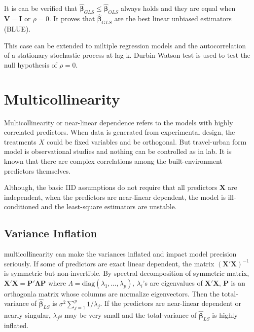 \documentclass[
  11pt,
  openany]{memoir}
\begin{document}
It is can be verified that \(\boldsymbol{\hat\beta}_{GLS}\le\boldsymbol{\hat\beta}_{OLS}\) always holds and they are equal when \(\mathbf{V=I}\) or \(\rho=0\). It proves that \(\boldsymbol{\hat\beta}_{GLS}\) are the best linear unbiased estimators (BLUE).

This case can be extended to miltiple regression models and the autocorrelation of a stationary stochastic process at lag-k.
Durbin-Watson test is used to test the null hypothesis of \(\rho=0\).

\hypertarget{multicollinearity}{%
\section{Multicollinearity}\label{multicollinearity}}

Multicollinearity or near-linear dependence refers to the models with highly correlated predictors. When data is generated from experimental design, the treatments \(X\) could be fixed variables and be orthogonal. But travel-urban form model is observational studies and nothing can be controlled as in lab. It is known that there are complex correlations among the built-environment predictors themselves.

Although, the basic IID assumptions do not require that all predictors \(\mathbf{X}\) are independent, when the predictors are near-linear dependent, the model is ill-conditioned and the least-square estimators are unstable.

\hypertarget{variance-inflation}{%
\subsection{Variance Inflation}\label{variance-inflation}}

multicollinearity can make the variances inflated and impact model precision seriously. If some of predictors are exact linear dependent, the matrix \((\mathbf{X'X})^{-1}\) is symmetric but non-invertible. By spectral decomposition of symmetric matrix, \(\mathbf{X'X}=\mathbf{P'\Lambda P}\) where \(\Lambda=\text{diag}(\lambda_1,...,\lambda_p)\), \(\lambda_i\)'s are eigenvalues of \(\mathbf{X'X}\), \(\mathbf{P}\) is an orthogonla matrix whose columns are normalize eigenvectors. Then the total-variance of \(\boldsymbol{\hat\beta}_{LS}\) is \(\sigma^2\sum_{j=1}^p1/\lambda_j\).
If the predictors are near-linear dependent or nearly singular, \(\lambda_j\)s may be very small and the total-variance of \(\boldsymbol{\hat\beta}_{LS}\) is highly inflated.
\end{document}
